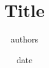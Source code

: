 \documentclass{article}
\title{Title}
\author{authors}
\date{date}
\begin{document}
\maketitle

\begin{abstract}
  
\end{abstract}












\end{document}
